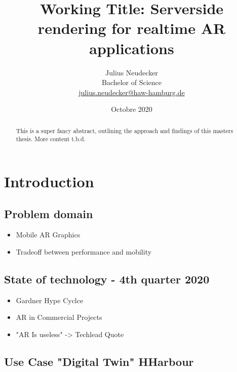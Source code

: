 \documentclass[titlepage, a4paper, 11pt]{scrartcl}
\begin{document}
    \title{Working Title: Serverside rendering for realtime AR applications}
    \author{Julius Neudecker \\ Bachelor of Science \\ \href{mailto:julius.neudecker@haw-hamburg.de}{julius.neudecker@haw-hamburg.de} }
    \date{Octobre 2020}

    \maketitle

    \tableofcontents

    \begin{abstract}
        This is a super fancy abstract, outlining the approach and findings of this masters thesis. More content t.b.d.
    \end{abstract}

    \section{Introduction}

        \subsection{Problem domain}

            \begin{itemize}
                \item Mobile AR Graphics
                \item Tradeoff between performance and mobility
            \end{itemize}

        \subsection{State of technology - 4th quarter 2020}

            \begin{itemize}
                \item Gardner Hype Cyclce
                \item AR in Commercial Projects
                \item "AR Is useless" -> Techlead Quote
            \end{itemize}

        \subsection{Use Case "Digital Twin" HHarbour}
\end{document}
